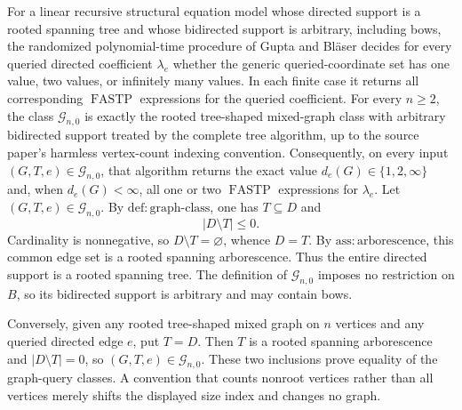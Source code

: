For a linear recursive structural equation model whose directed support is a rooted spanning tree and whose bidirected support is arbitrary, including bows, the randomized polynomial-time procedure of Gupta and Bl\"aser decides for every queried directed coefficient \(\lambda_e\) whether the generic queried-coordinate set has one value, two values, or infinitely many values. In each finite case it returns all corresponding \(\operatorname{FASTP}\) expressions for the queried coefficient.
For every \(n\geq2\), the class \(\mathcal G_{n,0}\) is exactly the rooted tree-shaped mixed-graph class with arbitrary bidirected support treated by the complete tree algorithm, up to the source paper's harmless vertex-count indexing convention. Consequently, on every input \((G,T,e)\in\mathcal G_{n,0}\), that algorithm returns the exact value \(d_e(G)\in\{1,2,\infty\}\) and, when \(d_e(G)<\infty\), all one or two \(\operatorname{FASTP}\) expressions for \(\lambda_e\).
Let \((G,T,e)\in\mathcal G_{n,0}\). By \(\mathrm{def:graph\mbox{-}class}\), one has \(T\subseteq D\) and
\[
 |D\setminus T|\leq0.
\]
Cardinality is nonnegative, so \(D\setminus T=\varnothing\), whence \(D=T\). By \(\mathrm{ass:arborescence}\), this common edge set is a rooted spanning arborescence. Thus the entire directed support is a rooted spanning tree. The definition of \(\mathcal G_{n,0}\) imposes no restriction on \(B\), so its bidirected support is arbitrary and may contain bows.

Conversely, given any rooted tree-shaped mixed graph on \(n\) vertices and any queried directed edge \(e\), put \(T=D\). Then \(T\) is a rooted spanning arborescence and \(|D\setminus T|=0\), so \((G,T,e)\in\mathcal G_{n,0}\). These two inclusions prove equality of the graph-query classes. A convention that counts nonroot vertices rather than all vertices merely shifts the displayed size index and changes no graph.

